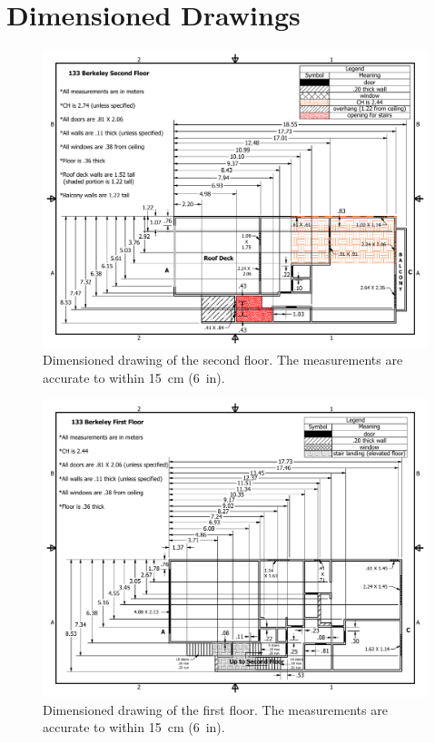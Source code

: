 \documentclass[12pt,oneside]{book}
\begin{document}
\appendix

\chapter{Dimensioned Drawings}
\label{sec:drawings}

\begin{figure}
\includegraphics[width=8in]{../Figures/Drawing_Second_Floor_Metric}
\caption[Dimensioned drawing of the second floor.]
{Dimensioned drawing of the second floor. The measurements are accurate to within 15~cm (6~in).}
\label{fig:drawing_second_floor}
\end{figure}

\begin{figure}
\includegraphics[width=8in]{../Figures/Drawing_First_Floor_Metric}
\caption[Dimensioned drawing of the first floor.]
{Dimensioned drawing of the first floor. The measurements are accurate to within 15~cm (6~in).}
\label{fig:drawing_first_floor}
\end{figure}
\end{document}
